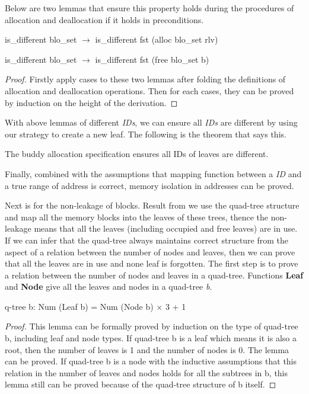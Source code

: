 Below are two lemmas that ensure this property holds during the procedures of allocation and deallocation if it holds in preconditions.

\begin{lemma}
is\_different blo\_set $\longrightarrow$ is\_different fst (alloc blo\_set rlv)
\end{lemma}

\begin{lemma}
is\_different blo\_set $\longrightarrow$ is\_different fst (free blo\_set b)
\end{lemma}

\begin{proof}
Firstly apply cases to these two lemmas after folding the definitions of allocation and deallocation operations. Then for each cases, they can be proved by induction on the height of the derivation.
\end{proof}

With above lemmas of different \emph{IDs}, we can ensure all \emph{IDs} are different by using our strategy to create a new leaf. The following is the theorem that says this.

\begin{theorem}
The buddy allocation specification ensures all IDs of leaves are different.
\end{theorem}

Finally, combined with the assumptions that mapping function between a \emph{ID} and a true range of address is correct, memory isolation in addresses can be proved.

Next is for the non-leakage of blocks. Result from we use the quad-tree structure and map all the memory blocks into the leaves of these trees, thence the non-leakage means that all the leaves (including occupied and free leaves) are in use. If we can infer that the quad-tree always maintains correct structure from the aspect of a relation between the number of nodes and leaves, then we can prove that all the leaves are in use and none leaf is forgotten. The first step is to prove a relation between the number of nodes and leaves in a quad-tree. Functions \textbf{Leaf} and \textbf{Node} give all the leaves and nodes in a quad-tree \emph{b}.

\begin{lemma}
q-tree b: Num (Leaf b) = Num (Node b) $\times$ 3 + 1
\end{lemma}

\begin{proof}
This lemma can be formally proved by induction on the type of quad-tree b, including leaf and node types. If quad-tree b is a leaf which means it is also a root, then the number of leaves is 1 and the number of nodes is 0. The lemma can be proved. If quad-tree b is a node with the inductive assumptions that this relation in the number of leaves and nodes holds for all the subtrees in b, this lemma still can be proved because of the quad-tree structure of b itself.
\end{proof}

